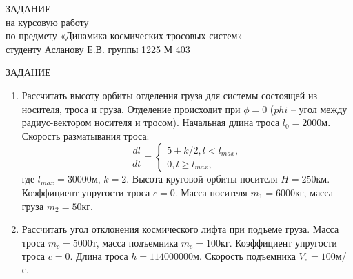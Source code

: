 \begin{center}
ЗАДАНИЕ\\
на курсовую работу\\
по предмету «Динамика космических тросовых систем»\\
студенту Асланову Е.В. группы 1225 М 403\\
\vspace{32pt}

ЗАДАНИЕ

\begin{enumerate}
	\item Рассчитать высоту орбиты отделения груза для системы состоящей из носителя, троса и груза. Отделение происходит при $\phi=0$ ($phi$ – угол между радиус-вектором носителя и тросом). Начальная длина троса $l_0=2000$м. Скорость разматывания троса:
	\begin{equation*}
		\frac{dl}{dt}=
		\begin{cases}
			5 + k/2, l < l_{max},\\
			0, l \geq l_{max},
		\end{cases}
	\end{equation*}
	где $l_{max} = 30000$м, $k=2$. Высота круговой орбиты носителя $H=250$км. Коэффициент упругости троса $c=0$. Масса носителя $m_1=6000$кг, масса груза $m_2=50$кг.
	\item Рассчитать угол отклонения космического лифта при подъеме груза. Масса троса $m_c = 5000$т, масса подъемника $m_e=100$кг. Коэффициент упругости троса $c=0$. Длина троса $h=114000000$м. Скорость подъемника $V_e=100$м/с.
\end{enumerate}
\end{center}
